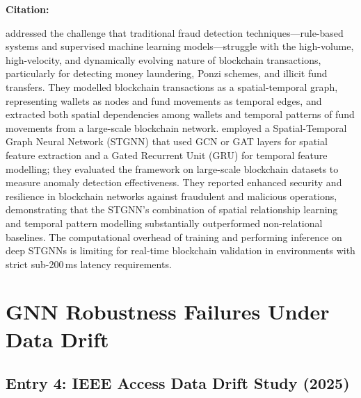 \documentclass[12pt, a4paper]{article}
\newenvironment{surveyentry}[1]{%
  \vspace{6pt}
  \noindent\textbf{\color{navyblue}#1}\par
  \vspace{2pt}
  \noindent\hspace{1em}%
  \begin{minipage}[t]{0.97\linewidth}
}{%
  \end{minipage}
  \vspace{10pt}
}
\begin{document}
\begin{surveyentry}{Citation: \cite{harper2025blockchain}}
\cite{harper2025blockchain} addressed the challenge that traditional fraud detection techniques---rule-based systems and supervised machine learning models---struggle with the high-volume, high-velocity, and dynamically evolving nature of blockchain transactions, particularly for detecting money laundering, Ponzi schemes, and illicit fund transfers. They modelled blockchain transactions as a spatial-temporal graph, representing wallets as nodes and fund movements as temporal edges, and extracted both spatial dependencies among wallets and temporal patterns of fund movements from a large-scale blockchain network. \cite{harper2025blockchain} employed a Spatial-Temporal Graph Neural Network (STGNN) that used GCN or GAT layers for spatial feature extraction and a Gated Recurrent Unit (GRU) for temporal feature modelling; they evaluated the framework on large-scale blockchain datasets to measure anomaly detection effectiveness. They reported enhanced security and resilience in blockchain networks against fraudulent and malicious operations, demonstrating that the STGNN's combination of spatial relationship learning and temporal pattern modelling substantially outperformed non-relational baselines. The computational overhead of training and performing inference on deep STGNNs is limiting for real-time blockchain validation in environments with strict sub-200\,ms latency requirements.
\end{surveyentry}

\section{GNN Robustness Failures Under Data Drift}

\subsection*{Entry 4: IEEE Access Data Drift Study (2025)}
\end{document}
